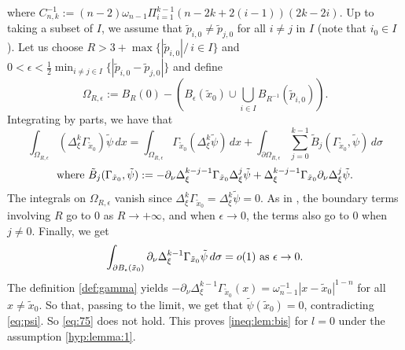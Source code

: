 \documentclass[reqno]{amsart}
\def \eps {\epsilon}
\begin{document}
where $C_{n,k}^{-1}:=(n-2)\omega_{n-1}\Pi_{i=1}^{k-1}(n-2k+2(i-1))(2k-2i)$. Up to taking a subset of $I$, we assume that $\tilde{p}_{i,0}\neq\tilde{p}_{j,0}$ for all $i\neq j$ in $I$ (note that $i_0\in I$). Let us choose $R>3+\max\{|\tilde{p}_{i,0}|/\, i\in I\}$ and $0<\eps<\frac{1}{2}\min_{i\neq j\in I}\{|\tilde{p}_{i,0}-\tilde{p}_{j,0}|\}$ and define
$$\Omega_{R,\eps}:=B_R(0) - \left( B_{\eps}(\tilde{x}_0)\cup\bigcup_{i\in I}B_{R^{-1}}(\tilde{p}_{i,0})\right).$$
Integrating by parts, we have that
\begin{equation*}
\int_{\Omega_{R,\eps}}(\Delta^k_\xi\Gamma_{\tilde{x}_0})\tilde{\psi}\, dx=\int_{\Omega_{R,\eps}}\Gamma_{\tilde{x}_0}(\Delta^k_\xi\tilde{\psi})\, dx+\int_{\partial\Omega_{R,\eps}}\sum_{j=0}^{k-1}\tilde{B}_j(\Gamma_{\tilde{x}_0},\tilde{\psi})\, d\sigma
\end{equation*}
$$\hbox{where }\tilde{B}_j(\Gamma_{\tilde{x}_0},\tilde{\psi}):=-\partial_\nu\Delta_\xi^{k-j-1}\Gamma_{\tilde{x}_0}\Delta_\xi^j\tilde{\psi}+\Delta_\xi^{k-j-1}\Gamma_{\tilde{x}_0}\partial_\nu\Delta_\xi^j\tilde{\psi}.$$
The integrals on $\Omega_{R,\eps}$ vanish since $\Delta^k_\xi\Gamma_{\tilde{x}_0}=\Delta^k_\xi\tilde{\psi}=0$. As in \cite{robert:gjms}, the boundary terms involving $R$ go to $0$ as $R\to +\infty$, and when $\eps\to 0$, the terms also go to $0$ when $j\neq 0$. Finally, we get
$$\int_{\partial B_{\eps}(\tilde{x}_0)}\partial_\nu\Delta_\xi^{k-1}\Gamma_{\tilde{x}_0} \tilde{\psi}\, d\sigma=o(1)\hbox{ as }\eps\to 0.$$
The definition \eqref{def:gamma} yields $-\partial_\nu\Delta_\xi^{k-1}\Gamma_{\tilde{x}_0}(x)=\omega_{n-1}^{-1}|x-\tilde{x}_0|^{1-n}$ for all $x\neq \tilde{x}_0$. So that, passing to the limit, we get that $\tilde{\psi}(\tilde{x}_0)=0$, contradicting \eqref{eq:psi}. So \eqref{eq:75} does not hold. This proves \eqref{ineq:lem:bis} for $l=0$ under the assumption \eqref{hyp:lemma:1}. 
\end{document}
